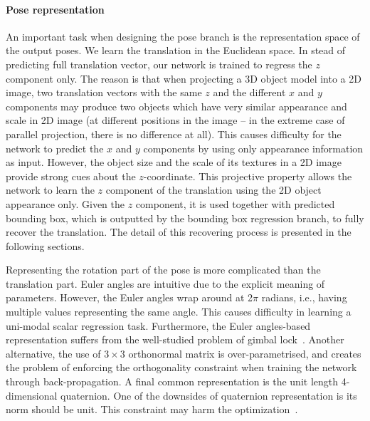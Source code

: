 \documentclass[conference]{IEEEtran}
\begin{document}
\paragraph{Pose representation}
An important task when designing the pose branch is the representation space of the output poses. We learn the translation in the Euclidean space. In stead of predicting full translation vector, our network is trained to regress the $z$ component only. The reason is that when projecting a 3D object model into a 2D image, two translation vectors with the same $z$ and the different $x$ and $y$ components may produce two objects which have very similar appearance and scale in 2D image (at different positions in the image -- in the extreme case of parallel projection, there is no difference at all). This causes difficulty for the network to predict the $x$ and $y$ components by using only appearance information as input. However, the object size and the scale of its textures in a 2D image provide strong cues about the $z$-coordinate. 
This projective property allows the network to learn the $z$ component of the translation using the 2D object appearance only. Given the $z$ component, it is used together with predicted bounding box, which is outputted by the bounding box regression branch, to fully recover the translation. 
The detail of this recovering process is presented in the following sections.  

Representing the rotation part of the pose is more complicated than the translation part. Euler angles are intuitive due to the explicit meaning of parameters. %
However, the Euler angles wrap around at 2$\pi$ radians, i.e., having multiple values representing the same angle. This causes difficulty in learning a uni-modal scalar regression task.  
Furthermore, the Euler angles-based representation suffers from the well-studied problem of gimbal lock~\cite{pose}. Another alternative, the use of $3\times3$ orthonormal matrix is over-parametrised, and creates the problem of enforcing the orthogonality constraint when training the network through back-propagation. A final common representation is the unit length 4-dimensional quaternion. 
One of the downsides of quaternion representation is its norm should be unit. This constraint may harm the optimization~\cite{DBLP:conf/iccv/KendallGC15}. 
 
\end{document}
